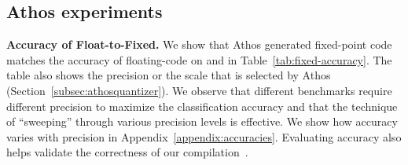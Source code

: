 
\begin{comment}
\begin{table}
  \centering
  \resizebox{0.7\columnwidth}{!}{

      \begin{tabular}{|l|c|c|c|c|}
    \hline
    Benchmark & Aramis Gains over Mal. QuantizedNN\\
    \hline
	SecureNN N/W A & $9$x \\
	\hline
	SecureNN N/W B & $32.7$x \\
	\hline
	SecureNN N/W C & $34.1$x \\
	\hline
	SecureNN N/W D & $7.9$x \\
	\hline

\end{tabular}
}
 \caption{MNIST dataset -- Aramis vs Malicious QuantizedNN}
\label{tab:aramisvsspdz}
\end{table}
\end{comment}




\subsection{Athos experiments}
\label{sec:athosexperiments}
\noindent\textbf{Accuracy of Float-to-Fixed.} 
We show that Athos generated fixed-point code matches the accuracy of floating-code on \resnet and \densenet in Table~\ref{tab:fixed-accuracy}.
The table also shows the precision or the scale that is selected by Athos (Section~\ref{subsec:athosquantizer}). We observe that different benchmarks require different precision to maximize the classification accuracy and that the technique of ``sweeping'' through various precision levels is effective.
We show how accuracy varies with precision in Appendix~\ref{appendix:accuracies}.
Evaluating accuracy also helps validate the correctness of our compilation~\cite{frigate}. 

